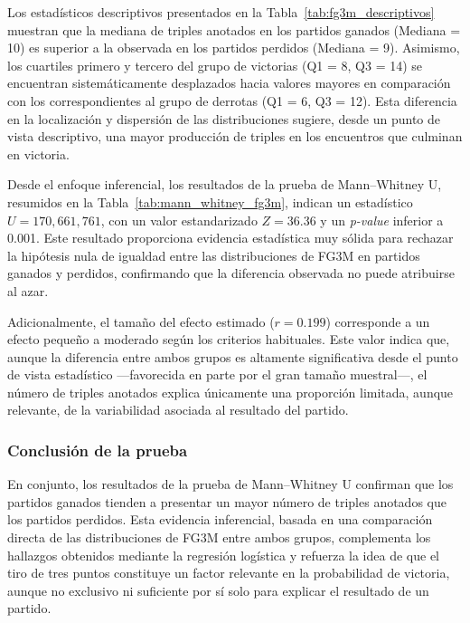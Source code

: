 \documentclass[12pt]{article}
\begin{document}


Los estadísticos descriptivos presentados en la Tabla~\ref{tab:fg3m_descriptivos} muestran que la
mediana de triples anotados en los partidos ganados (Mediana = 10) es superior a la observada
en los partidos perdidos (Mediana = 9). Asimismo, los cuartiles primero y tercero del grupo de
victorias (Q1 = 8, Q3 = 14) se encuentran sistemáticamente desplazados hacia valores mayores en
comparación con los correspondientes al grupo de derrotas (Q1 = 6, Q3 = 12). Esta diferencia
en la localización y dispersión de las distribuciones sugiere, desde un punto de vista
descriptivo, una mayor producción de triples en los encuentros que culminan en victoria.

Desde el enfoque inferencial, los resultados de la prueba de Mann--Whitney U, resumidos en la
Tabla~\ref{tab:mann_whitney_fg3m}, indican un estadístico $U = 170,661,761$, con un valor
estandarizado $Z = 36.36$ y un \textit{p-value} inferior a 0.001. Este resultado proporciona
evidencia estadística muy sólida para rechazar la hipótesis nula de igualdad entre las
distribuciones de FG3M en partidos ganados y perdidos, confirmando que la diferencia observada
no puede atribuirse al azar.

Adicionalmente, el tamaño del efecto estimado ($r = 0.199$) corresponde a un efecto pequeño a
moderado según los criterios habituales. Este valor indica que, aunque la diferencia entre
ambos grupos es altamente significativa desde el punto de vista estadístico —favorecida en
parte por el gran tamaño muestral—, el número de triples anotados explica únicamente una
proporción limitada, aunque relevante, de la variabilidad asociada al resultado del partido.

\subsubsection{Conclusión de la prueba}

En conjunto, los resultados de la prueba de Mann--Whitney U confirman que los partidos ganados
tienden a presentar un mayor número de triples anotados que los partidos perdidos. Esta
evidencia inferencial, basada en una comparación directa de las distribuciones de FG3M entre
ambos grupos, complementa los hallazgos obtenidos mediante la regresión logística y refuerza la
idea de que el tiro de tres puntos constituye un factor relevante en la probabilidad de
victoria, aunque no exclusivo ni suficiente por sí solo para explicar el resultado de un
partido.
\end{document}
